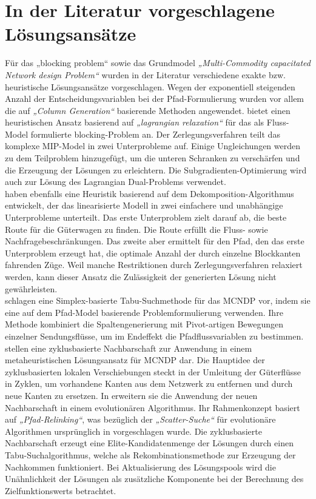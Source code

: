 \section{In der Literatur vorgeschlagene Lösungsansätze}
Für das {„blocking problem“} sowie das Grundmodel \textit{„Multi-Commodity capacitated Network design Problem“} wurden in der Literatur verschiedene exakte bzw. heuristische Lösungsansätze vorgeschlagen. Wegen der exponentiell steigenden Anzahl der Entscheidungsvariablen bei der Pfad-Formulierung wurden vor allem die auf \textit{„Column Generation“} basierende Methoden angewendet. \cite{barnhart2000railroad} bietet einen heuristischen Ansatz basierend auf \emph{„lagrangian relaxation“} für das als Fluss-Model formulierte blocking-Problem an. Der Zerlegungsverfahren teilt das komplexe MIP-Model in zwei Unterprobleme auf. Einige Ungleichungen werden zu dem Teilproblem hinzugefügt, um die unteren Schranken zu verschärfen und die Erzeugung der Lösungen zu erleichtern. Die Subgradienten-Optimierung wird auch zur Lösung des Lagrangian Dual-Problems verwendet.\\
\cite{hasany2018modeling} haben ebenfalls eine Heuristik basierend auf dem Dekomposition-Algorithmus entwickelt, der das linearisierte Modell in zwei einfachere und unabhängige Unterprobleme unterteilt. Das erste Unterproblem zielt darauf ab, die beste Route für die Güterwagen zu finden. Die Route erfüllt die Fluss- sowie Nachfragebeschränkungen. Das zweite aber ermittelt für den Pfad, den das erste Unterproblem erzeugt hat, die optimale Anzahl der durch einzelne Blockkanten fahrenden Züge. Weil manche Restriktionen durch Zerlegungsverfahren relaxiert werden, kann dieser Ansatz die Zulässigkeit der generierten Lösung nicht gewährleisten.\\
\cite{crainic2000simplex} schlagen eine Simplex-basierte Tabu-Suchmethode für das MCNDP vor, indem sie eine auf dem Pfad-Model basierende Problemformulierung verwenden. Ihre Methode kombiniert die Spaltengenerierung mit Pivot-artigen Bewegungen einzelner Sendungsflüsse, um im Endeffekt die Pfadflussvariablen zu bestimmen.\\
\cite{ghamlouche2003cycle} stellen eine zyklusbasierte Nachbarschaft zur Anwendung in einem metaheuristischen Lösungsansatz für MCNDP dar. Die Hauptidee der zyklusbasierten lokalen Verschiebungen steckt in der Umleitung der Güterflüsse in Zyklen, um vorhandene Kanten aus dem Netzwerk zu entfernen und durch neue Kanten zu ersetzen. In \cite{ghamlouche2004path} erweitern sie die Anwendung der neuen Nachbarschaft in einem evolutionären Algorithmus. Ihr Rahmenkonzept basiert auf \emph{„Pfad-Relinking“}, was bezüglich der \emph{„Scatter-Suche“} für evolutionäre Algorithmen ursprünglich in \cite{glover1998template} vorgeschlagen wurde. Die zyklusbasierte Nachbarschaft erzeugt eine Elite-Kandidatenmenge der Lösungen durch einen Tabu-Suchalgorithmus, welche als Rekombinationsmethode zur Erzeugung der Nachkommen funktioniert. Bei Aktualisierung des Lösungspools wird die Unähnlichkeit der Lösungen als zusätzliche Komponente bei der Berechnung des Zielfunktionswerts betrachtet.\\
